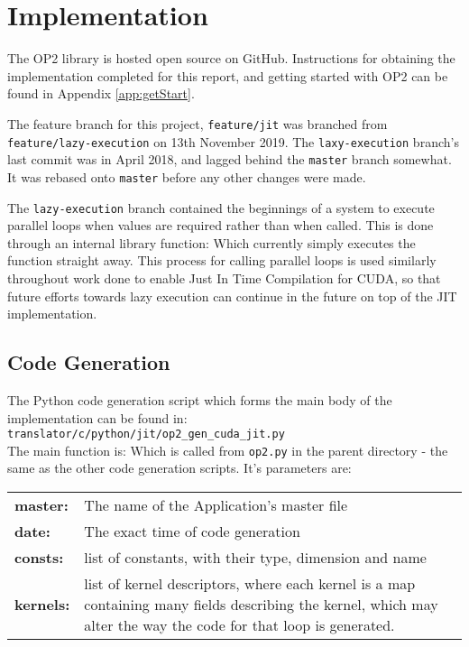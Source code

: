 
\section{Implementation}
The OP2 library is hosted open source on GitHub\cite{OP2rep}. Instructions for obtaining the implementation completed for this report, and getting started with OP2 can be found in Appendix \ref{app:getStart}.
\par
The feature branch for this project, \verb|feature/jit| was branched from \\\verb|feature/lazy-execution| on 13th November 2019. The \verb|laxy-execution| branch's last commit was in April 2018, and lagged behind the \verb|master| branch somewhat. It was rebased onto \verb|master| before any other changes were made.
\par
The \verb|lazy-execution| branch contained the beginnings of a system to execute parallel loops when values are required rather than when called. This is done through an internal library function:
Which currently simply executes the function straight away. This process for calling parallel loops is used similarly throughout work done to enable Just In Time Compilation for CUDA, so that future efforts towards lazy execution can continue in the future on top of the JIT implementation.

\subsection{Code Generation}
The Python code generation script which forms the main body of the implementation can be found in: \verb|translator/c/python/jit/op2_gen_cuda_jit.py|
\\
The main function is:
Which is called from \verb|op2.py| in the parent directory - the same as the other code generation scripts. It's parameters are:\\
\begin{tabular}{>{\bfseries}l l}
  master: & The name of the Application's master file \\
  date: & The exact time of code generation \\
  consts: & list of constants, with their type, dimension and name \\
  kernels: & \parbox[t]{.8\textwidth}{list of kernel descriptors, where each kernel is a map containing many fields describing the kernel, which may alter the way the code for that loop is generated.}
\end{tabular}
